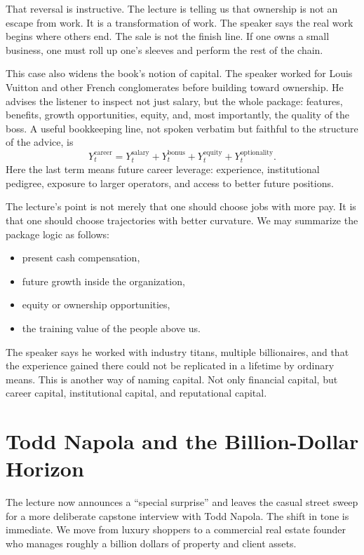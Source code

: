 That reversal is instructive. The lecture is telling us that ownership is not an escape from work. It is a transformation of work. The speaker says the real work begins where others end. The sale is not the finish line. If one owns a small business, one must roll up one's sleeves and perform the rest of the chain.

This case also widens the book's notion of capital. The speaker worked for Louis Vuitton and other French conglomerates before building toward ownership. He advises the listener to inspect not just salary, but the whole package: features, benefits, growth opportunities, equity, and, most importantly, the quality of the boss. A useful bookkeeping line, not spoken verbatim but faithful to the structure of the advice, is
\begin{equation}
Y_t^{\text{career}} = Y_t^{\text{salary}} + Y_t^{\text{bonus}} + Y_t^{\text{equity}} + Y_t^{\text{optionality}}.
\end{equation}
Here the last term means future career leverage: experience, institutional pedigree, exposure to larger operators, and access to better future positions.

The lecture's point is not merely that one should choose jobs with more pay. It is that one should choose trajectories with better curvature. We may summarize the package logic as follows:
\begin{itemize}
\item present cash compensation,
\item future growth inside the organization,
\item equity or ownership opportunities,
\item the training value of the people above us.
\end{itemize}

The speaker says he worked with industry titans, multiple billionaires, and that the experience gained there could not be replicated in a lifetime by ordinary means. This is another way of naming capital. Not only financial capital, but career capital, institutional capital, and reputational capital.

\section{Todd Napola and the Billion-Dollar Horizon}

The lecture now announces a ``special surprise'' and leaves the casual street sweep for a more deliberate capstone interview with Todd Napola. The shift in tone is immediate. We move from luxury shoppers to a commercial real estate founder who manages roughly a billion dollars of property and client assets.

